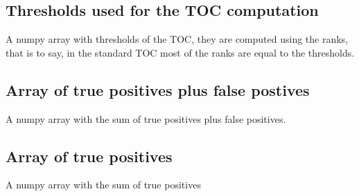 \documentclass[letterpaper,10pt,english]{sphinxmanual}
\begin{document}
\subsection{Thresholds used for the TOC computation}
\label{\detokenize{usage:thresholds-used-for-the-toc-computation}}

\begin{fulllineitems}
\label{\detokenize{usage:ootoc.TOC.thresholds}}
\pysigstartsignatures
{}
\pysigstopsignatures
\sphinxAtStartPar
A numpy array with thresholds of the TOC, they are computed using the ranks, that is to say, in the standard TOC most of the ranks are equal to the thresholds.

\end{fulllineitems}



\subsection{Array of true positives plus false postives}
\label{\detokenize{usage:array-of-true-positives-plus-false-postives}}

\begin{fulllineitems}
\label{\detokenize{usage:ootoc.TOC.TPplusFP}}
\pysigstartsignatures
{}
\pysigstopsignatures
\sphinxAtStartPar
A numpy array with the sum of true positives plus false positives.

\end{fulllineitems}



\subsection{Array of true positives}
\label{\detokenize{usage:array-of-true-positives}}

\begin{fulllineitems}
\label{\detokenize{usage:ootoc.TOC.TP}}
\pysigstartsignatures
{}
\pysigstopsignatures
\sphinxAtStartPar
A numpy array with the sum of true positives

\end{fulllineitems}
\end{document}
